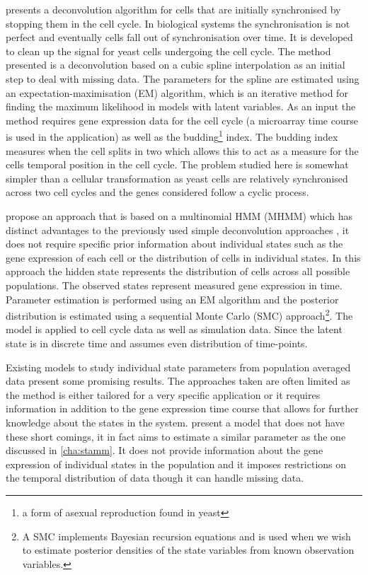 \cite{Bar-Joseph04082004} presents a deconvolution algorithm for cells that are initially synchronised by  stopping them in the cell cycle. In biological systems the synchronisation is not perfect and eventually cells fall out of synchronisation over time. It is developed to clean up the signal for yeast cells undergoing the cell cycle. The method presented is a deconvolution based on a cubic spline interpolation as an initial step to deal with missing data. The  parameters for the spline are estimated using an expectation-maximisation (EM) algorithm, which is an iterative method for finding the maximum likelihood in models with latent variables. As an input the method requires gene expression data for the cell cycle (a microarray time course is used in the application) as well as the budding\footnote{a form of asexual reproduction found in yeast} index. The budding index measures when the cell splits in two which allows this to act as a measure for the cells temporal position in the cell cycle. The problem studied here is somewhat simpler than a cellular transformation as yeast cells are relatively synchronised across two cell cycles and the genes considered follow a cyclic process.

\cite{Roy:2006ik} propose an approach that is based on a multinomial HMM (MHMM) which has distinct advantages to the previously used simple deconvolution approaches \citep{Bar-Joseph04082004,Lahdesmaki:2005fh}, it does not require specific prior information about individual states such as the gene expression of each cell or the distribution of cells in individual states. In this approach the hidden state represents the distribution of cells across all possible populations. The observed states represent measured gene expression in time. Parameter estimation is performed using an EM algorithm and the posterior distribution is estimated using a sequential Monte Carlo (SMC) approach\footnote{A SMC implements Bayesian recursion equations and is used when we wish to estimate posterior densities of the state variables from known observation variables.}. The model is applied to cell cycle data as well as simulation data. Since the latent state is in discrete time and assumes even distribution of time-points.

Existing models to study individual state parameters from population averaged data present some promising results. The approaches taken are often limited as the method is either tailored for a very specific application or it requires information in addition to the gene expression time course that allows for further knowledge about the states in the system. \cite{Roy:2006ik} present a model that does not have these short comings, it in fact aims to estimate a similar parameter as the one discussed in \ref{cha:stamm}. It does not provide information about the gene expression of individual states in the population and it imposes restrictions on the temporal distribution of data though it can handle missing data.

